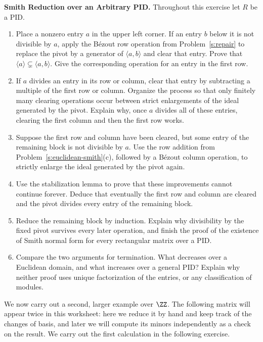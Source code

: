 \documentclass[12pt,reqno]{amsart}
\begin{document}
\hrulefill

\begin{problems}
\item\label{s:pid-smith} \textbf{Smith Reduction over an Arbitrary PID.} Throughout this exercise let $R$ be a PID.
\begin{enumerate}
\item Place a nonzero entry $a$ in the upper left corner. If an entry $b$ below it is not divisible by $a$, apply the B\'ezout row operation from Problem~\ref{s:repair} to replace the pivot by a generator of $\langle a,b\rangle$ and clear that entry. Prove that $\langle a\rangle\subsetneq\langle a,b\rangle$. Give the corresponding operation for an entry in the first row.
\item If $a$ divides an entry in its row or column, clear that entry by subtracting a multiple of the first row or column. Organize the process so that only finitely many clearing operations occur between strict enlargements of the ideal generated by the pivot. Explain why, once $a$ divides all of these entries, clearing the first column and then the first row works.
\item Suppose the first row and column have been cleared, but some entry of the remaining block is not divisible by $a$. Use the row addition from Problem~\ref{s:euclidean-smith}(c), followed by a B\'ezout column operation, to strictly enlarge the ideal generated by the pivot again.
\item Use the stabilization lemma to prove that these improvements cannot continue forever. Deduce that eventually the first row and column are cleared and the pivot divides every entry of the remaining block.
\item Reduce the remaining block by induction. Explain why divisibility by the fixed pivot survives every later operation, and finish the proof of the existence of Smith normal form for every rectangular matrix over a PID.
\item Compare the two arguments for termination. What decreases over a Euclidean domain, and what increases over a general PID? Explain why neither proof uses unique factorization of the entries, or any classification of modules.
\end{enumerate}
\end{problems}

\hrulefill

We now carry out a second, larger example over $\ZZ$. The following matrix will appear twice in this worksheet: here we reduce it by hand and keep track of the changes of basis, and later we will compute its minors independently as a check on the result. We carry out the first calculation in the following exercise.
\end{document}
